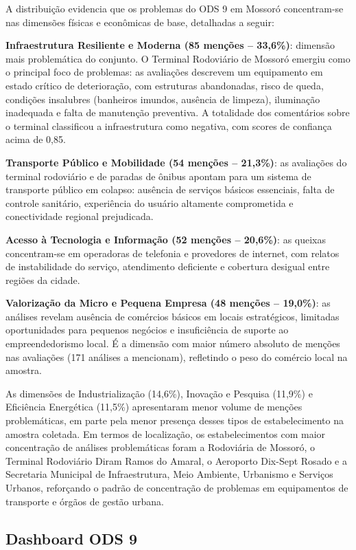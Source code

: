 A distribuição evidencia que os problemas do ODS 9 em Mossoró concentram-se nas dimensões físicas e econômicas de base, detalhadas a seguir:

\textbf{Infraestrutura Resiliente e Moderna (85 menções -- 33,6\%)}: dimensão mais problemática do conjunto. O Terminal Rodoviário de Mossoró emergiu como o principal foco de problemas: as avaliações descrevem um equipamento em estado crítico de deterioração, com estruturas abandonadas, risco de queda, condições insalubres (banheiros imundos, ausência de limpeza), iluminação inadequada e falta de manutenção preventiva. A totalidade dos comentários sobre o terminal classificou a infraestrutura como negativa, com scores de confiança acima de 0,85.

\textbf{Transporte Público e Mobilidade (54 menções -- 21,3\%)}: as avaliações do terminal rodoviário e de paradas de ônibus apontam para um sistema de transporte público em colapso: ausência de serviços básicos essenciais, falta de controle sanitário, experiência do usuário altamente comprometida e conectividade regional prejudicada.

\textbf{Acesso à Tecnologia e Informação (52 menções -- 20,6\%)}: as queixas concentram-se em operadoras de telefonia e provedores de internet, com relatos de instabilidade do serviço, atendimento deficiente e cobertura desigual entre regiões da cidade.

\textbf{Valorização da Micro e Pequena Empresa (48 menções -- 19,0\%)}: as análises revelam ausência de comércios básicos em locais estratégicos, limitadas oportunidades para pequenos negócios e insuficiência de suporte ao empreendedorismo local. É a dimensão com maior número absoluto de menções nas avaliações (171 análises a mencionam), refletindo o peso do comércio local na amostra.

As dimensões de Industrialização (14,6\%), Inovação e Pesquisa (11,9\%) e Eficiência Energética (11,5\%) apresentaram menor volume de menções problemáticas, em parte pela menor presença desses tipos de estabelecimento na amostra coletada. Em termos de localização, os estabelecimentos com maior concentração de análises problemáticas foram a Rodoviária de Mossoró, o Terminal Rodoviário Diram Ramos do Amaral, o Aeroporto Dix-Sept Rosado e a Secretaria Municipal de Infraestrutura, Meio Ambiente, Urbanismo e Serviços Urbanos, reforçando o padrão de concentração de problemas em equipamentos de transporte e órgãos de gestão urbana.

\subsection{Dashboard ODS 9}
\label{subsec:dashboard-ods9}

